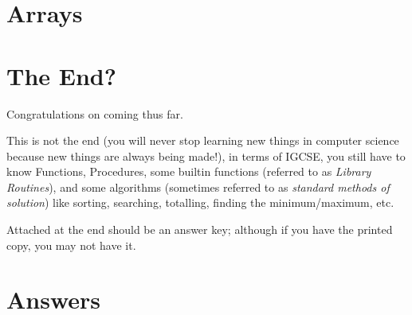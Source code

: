 \documentclass[a4paper, 11pt]{article}
\begin{document}
\newpage
\section{Arrays}


\section{The End?}

Congratulations on coming thus far.

This is not the end (you will never stop learning new things in computer science because new things are always being made!), in terms of IGCSE, you still have to know Functions, Procedures, some builtin functions (referred to as \emph{Library Routines}), and some algorithms (sometimes referred to as \emph{standard methods of solution}) like sorting, searching, totalling, finding the minimum/maximum, etc.

Attached at the end should be an answer key; although if you have the printed copy, you may not have it.

\newpage
\section{Answers}

\end{document}
